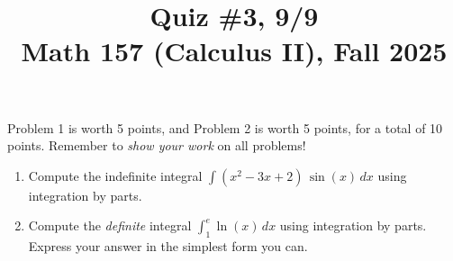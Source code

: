 \documentclass[11pt]{article}
\title{Quiz \#3, 9/9 \\ Math 157 (Calculus II), Fall 2025}
\date{}
\begin{document}
\maketitle

\thispagestyle{empty}

\vspace{-2cm}

Problem 1 is worth 5 points, and Problem 2 is worth 5 points, for a total of 10 points. Remember to \emph{show your work} on all problems!

\begin{enumerate}
\item Compute the indefinite integral $\displaystyle \int (x^2-3x+2) \, \sin(x) \, dx$ using integration by parts.

\vspace{8cm}

\item Compute the \emph{definite} integral $\displaystyle \int_{1}^{e} \ln(x) \, dx$ using integration by parts. Express your answer in the simplest form you can.

\end{enumerate}
\end{document}
